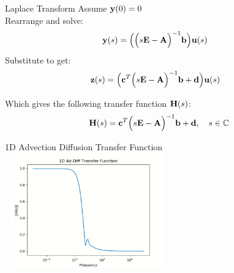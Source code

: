 \begin{frame}{Laplace Transform}
Assume ${\bf y}(0) = 0$\\
\bigskip
Rearrange and solve:
    \begin{align*}
        {\bf y}(s) &= \Big(\Big( s{\bf E} - {\bf A} \Big)^{-1} {\bf b} \Big) {\bf u}(s)
    \end{align*}
Substitute to get:
    \begin{align*}
        {\bf z}(s) &=  \Big( {\bf c}^T \Big(s{\bf E} - {\bf A} \Big)^{-1} {\bf b} + {\bf d} \Big) {\bf u}(s)
    \end{align*}

 Which gives the following transfer function ${\bf H}(s)$:
    \begin{align*}
        {\bf H}(s) &= {\bf c}^T \Big( s{\bf E}- {\bf A} \Big)^{-1} {\bf b} + {\bf d}, \quad s \in \mathbb{C}\\
    \end{align*}
\end{frame}
\begin{frame}{1D Advection Diffusion Transfer Function}
    \centering
    \includegraphics[width=7cm, height=5cm]{figures/1d_transfer.PNG}
\end{frame}